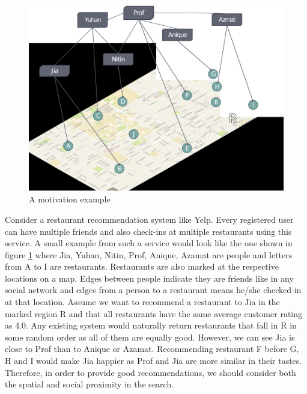 \begin{figure}[h]
	\centering
	\includegraphics[width=0.75\linewidth]{images/begin_example.eps}
	\caption{A motivation example}
	\label{fig:begin-example}
\end{figure}

Consider a restaurant recommendation system like Yelp. Every registered user can have multiple friends and also check-ins at multiple restaurants using this service. A small example from such a service would look like the one shown in figure \ref{fig:begin-example} where Jia, Yuhan, Nitin, Prof, Anique, Azamat are people and letters from A to I are restaurants. Restaurants are also marked at the respective locations on a map. Edges between people indicate they are friends like in any social network and edges from a person to a restaurant means he/she checked-in at that location. Assume we want to recommend a restaurant to Jia in the marked region R and that all restaurants have the same average customer rating as 4.0. Any existing system would naturally return restaurants that fall in R in some random order as all of them are equally good. However, we can see Jia is close to Prof than to Anique or Azamat. Recommending restaurant F before G, H and I would make Jia happier as Prof and Jia are more similar in their tastes. Therefore, in order to provide good recommendations, we should consider both the spatial and social proximity in the search.

